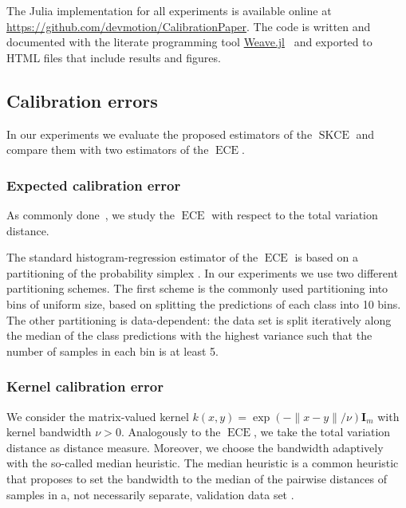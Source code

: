 \documentclass{article}
\DeclareMathOperator{\ECE}{ECE}
\DeclareMathOperator{\squaredkernelmeasure}{SKCE}
\begin{document}
The Julia implementation for all experiments is available online at
\url{https://github.com/devmotion/CalibrationPaper}. The code is written and
documented with the literate programming tool
\href{https://github.com/JunoLab/Weave.jl}{Weave.jl}~\citep{pastell17_weave}
and exported to HTML files that include results and figures.

\subsection{Calibration errors}

In our experiments we evaluate the proposed estimators of the
$\squaredkernelmeasure$ and compare them with two estimators of the $\ECE$.

\subsubsection{Expected calibration error}

As commonly done~\citep{broecker07_increas_reliab_reliab_diagr,guo17_calib_moder_neural_networ,vaicenavicius19_evaluat},
we study the $\ECE$ with respect to the total variation distance.

The standard histogram-regression estimator of the $\ECE$ is based on a
partitioning of the probability simplex
\citep{guo17_calib_moder_neural_networ,vaicenavicius19_evaluat}. In our experiments
we use two different partitioning schemes. The first scheme is the commonly
used partitioning into bins of uniform size, based on splitting the predictions
of each class into 10 bins. The other partitioning is data-dependent: the data
set is split iteratively along the median of the class predictions with the
highest variance such that the number of samples in each bin is at least 5.

\subsubsection{Kernel calibration error}

We consider the matrix-valued kernel
$k(x, y) = \exp{(-\|x - y\| / \nu)} \mathbf{I}_m$ with kernel bandwidth
$\nu > 0$. Analogously to the $\ECE$, we take the total variation distance as
distance measure. Moreover, we choose the bandwidth adaptively with the
so-called median heuristic. The median heuristic is a common heuristic that
proposes to set the bandwidth to the median of the pairwise distances of samples
in a, not necessarily separate, validation data set
\citep[see, e.g.,][]{gretton12_kernel_two_sampl_test}.
\end{document}
